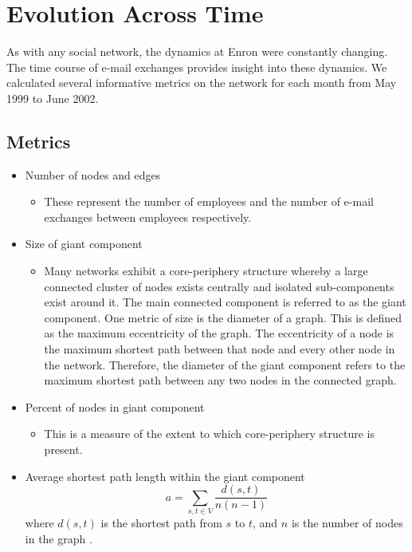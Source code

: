 \documentclass[12pt]{article}
\begin{document}
\section{Evolution Across Time} As with any social network, the dynamics at Enron were constantly changing. The time course of e-mail exchanges provides insight into these dynamics. We calculated several informative metrics on the network for each month from May 1999 to June 2002. 

\subsection{Metrics}

\begin{itemize}

\item Number of nodes and edges
\begin{itemize}
\item These represent the number of employees and the number of e-mail exchanges between employees respectively.
\end{itemize}


\item Size of giant component
\begin{itemize}
\item Many networks exhibit a core-periphery structure whereby a large connected cluster of nodes exists centrally and isolated sub-components exist around it. The main connected component is referred to as the giant component. One metric of size is the diameter of a graph. This is defined as the maximum eccentricity of the graph. The eccentricity of a node is the maximum shortest path between that node and every other node in the network. Therefore, the diameter of the giant component refers to the maximum shortest path between any two nodes in the connected graph.
\end{itemize}


\item Percent of nodes in giant component
	\begin{itemize}
		\item This is a measure of the extent to which core-periphery structure is present.
	\end{itemize}

\item Average shortest path length within the giant component
	\begin{equation}
		a = \sum\limits_{s,t\in V}  \frac{d(s,t)}{n(n-1)}		
	\end{equation}
where $d(s,t)$ is the shortest path from $s$ to $t$, and $n$ is the number of nodes in the graph  \cite{networkx}.


\end{itemize}
\end{document}
